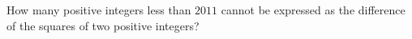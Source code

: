 How many positive integers less than $2011$ cannot be expressed as the difference of the squares of two positive integers?
